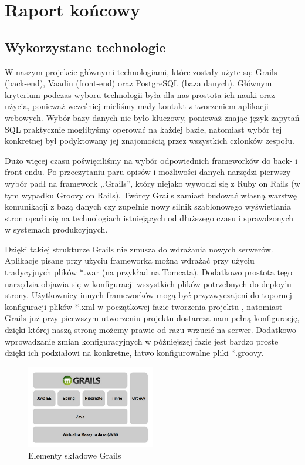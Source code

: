 \chapter{Raport końcowy}
\label{cha:raport}

\section{Wykorzystane technologie}
\label{sec:technologie}

W naszym projekcie głównymi technologiami, które zostały użyte są: Grails (back-end), Vaadin (front-end) oraz PostgreSQL (baza danych). Głównym kryterium podczas wyboru technologii była dla nas prostota ich nauki oraz użycia, ponieważ wcześniej mieliśmy mały kontakt z tworzeniem aplikacji webowych. Wybór bazy danych nie było kluczowy, ponieważ znając język zapytań SQL praktycznie moglibyśmy operować na każdej bazie, natomiast wybór tej konkretnej był podyktowany jej znajomością przez wszystkich członków zespołu. 

Dużo więcej czasu poświęciliśmy na wybór odpowiednich frameworków do back- i front-endu. Po przeczytaniu paru opisów i możliwości danych narzędzi pierwszy wybór padł na framework ,,Grails'', który niejako wywodzi się z Ruby on Rails (w tym wypadku Groovy on Rails). Twórcy Grails zamiast budować własną warstwę komunikacji z bazą danych czy zupełnie nowy silnik szablonowego wyświetlania stron oparli się na technologiach istniejących od dłuższego czasu i sprawdzonych w systemach produkcyjnych. 

Dzięki takiej strukturze Grails nie zmusza do wdrażania nowych serwerów. Aplikacje pisane przy użyciu frameworka można wdrażać przy użyciu tradycyjnych plików *.war (na przykład na Tomcata). Dodatkowo prostota tego narzędzia objawia się w konfiguracji wszystkich plików potrzebnych do deploy'u strony. Użytkownicy innych frameworków mogą być przyzwyczajeni do topornej konfiguracji plików *.xml w początkowej fazie tworzenia projektu , natomiast Grails już przy pierwszym utworzeniu projektu dostarcza nam pełną konfigurację, dzięki której naszą stronę możemy prawie od razu wrzucić na serwer. Dodatkowo wprowadzanie zmian konfiguracyjnych w późniejszej fazie jest bardzo proste dzięki ich podziałowi na konkretne, łatwo konfigurowalne pliki *.groovy. 

\begin{figure}[h!]
\begin{center}
\includegraphics[width=0.5\textwidth]{./img/grails_stack.png}
\caption{Elementy składowe Grails}
\label{fig:grails-stack}
\end{center}
\end{figure}

